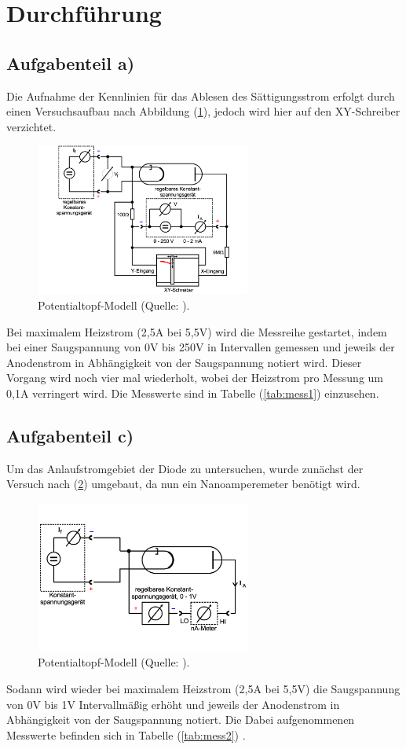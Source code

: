 \newpage
\section{Durchführung}
\subsection{Aufgabenteil a)}
Die Aufnahme der Kennlinien für das Ablesen des Sättigungsstrom erfolgt durch einen Versuchsaufbau nach Abbildung (\ref{fig:aufbau1}), 
jedoch wird hier auf den XY-Schreiber verzichtet.

\begin{figure}
    \centering
       \includegraphics[height=5cm]{aufbau1.pdf}
       \caption{Potentialtopf-Modell (Quelle: \cite{V504}).}
       \label{fig:aufbau1}
\end{figure}

\noindent
Bei maximalem Heizstrom (2,5A bei 5,5V) wird die Messreihe gestartet, 
indem bei einer Saugspannung von 0V bis 250V in Intervallen gemessen und jeweils der Anodenstrom in Abhängigkeit von der Saugspannung notiert wird.
Dieser Vorgang wird noch vier mal wiederholt, wobei der Heizstrom pro Messung um 0,1A verringert wird.
Die Messwerte sind in Tabelle (\ref{tab:mess1})
einzusehen.

\subsection{Aufgabenteil c)}
Um das Anlaufstromgebiet der Diode zu untersuchen, wurde zunächst der Versuch nach (\ref{fig:aufbau2}) umgebaut, 
da nun ein Nanoamperemeter benötigt wird.

\begin{figure}
    \centering
       \includegraphics[height=5cm]{aufbau2.pdf}
       \caption{Potentialtopf-Modell (Quelle: \cite{V504}).}
       \label{fig:aufbau2}
\end{figure}

\noindent
Sodann wird wieder bei maximalem Heizstrom (2,5A bei 5,5V) die Saugspannung von 0V bis 1V Intervallmäßig erhöht 
und jeweils der Anodenstrom in Abhängigkeit von der Saugspannung notiert.
Die Dabei aufgenommenen Messwerte befinden sich in Tabelle (\ref{tab:mess2})
.